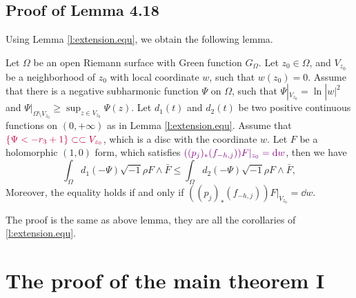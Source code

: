 \documentclass[twoside,openany,12pt]{beautynote}
\begin{document}
\subsection{Proof of Lemma 4.18}

Using Lemma \ref{l:extension.equ}, we obtain the following lemma.

\begin{lemma}
\label{l:extension_equ.extended} { \color{violet} Let $\Omega$ be an open Riemann
surface with Green function $G_{\Omega}$.} Let $z_{0}\in\Omega$, and
$V_{z_0}$ be a neighborhood of $z_{0}$ with local coordinate $w$,
such that $w(z_{0})=0$. Assume that there is a negative subharmonic
function $\Psi$ on $\Omega$, such that $\Psi|_{V_{z_0}}=\ln|w|^{2}$
and $\Psi|_{\Omega\setminus V_{z_0}}\geq\sup_{z\in V_{z_0}}\Psi(z)$.
Let $d_{1}(t)$ and $d_{2}(t)$ be two positive continuous functions
on $(0,+\infty)$ as in Lemma \ref{l:extension.equ}. Assume that
${\color{purple}\{\Psi<-r_{3}+1\}\subset\subset V_{z_0}}$, which is a disc with the
coordinate $w$. Let $F$ be a holomorphic $(1,0)$ form, which
satisfies ${ \color{violet} ((p_{j})_{*}(f_{-h,j}))F|_{z_{0}}=\dd w}$, then we have
$$\int_{\Omega}d_{1}(-\Psi)\sqrt{-1}\rho F\wedge\bar{F}\leq\int_{\Omega}d_{2}(-\Psi)\sqrt{-1}\rho F\wedge\bar{F},$$
Moreover, the equality holds if and only if $((p_{j})_{*}(f_{-h,j}))F|_{V_{z_0}}=\dd w$.
\end{lemma}
The proof is the same as above lemma, they are all the corollaries of \ref{l:extension.equ}.

\section{The proof of the main theorem I}


\clearpage
\pagestyle{\auxsettings}
\printbibliography[heading=bibintoc]
\end{document}
